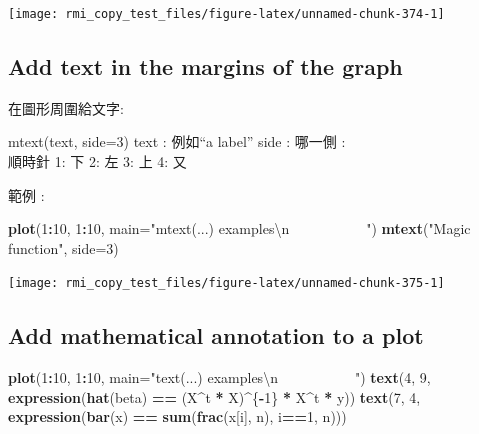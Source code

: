 \documentclass[]{book}
\newenvironment{Shaded}{\begin{snugshade}}{\end{snugshade}}
\newcommand{\KeywordTok}[1]{\textcolor[rgb]{0.13,0.29,0.53}{\textbf{#1}}}
\newcommand{\DataTypeTok}[1]{\textcolor[rgb]{0.13,0.29,0.53}{#1}}
\newcommand{\DecValTok}[1]{\textcolor[rgb]{0.00,0.00,0.81}{#1}}
\newcommand{\CharTok}[1]{\textcolor[rgb]{0.31,0.60,0.02}{#1}}
\newcommand{\StringTok}[1]{\textcolor[rgb]{0.31,0.60,0.02}{#1}}
\newcommand{\OperatorTok}[1]{\textcolor[rgb]{0.81,0.36,0.00}{\textbf{#1}}}
\newcommand{\NormalTok}[1]{#1}
\theoremstyle{definition}
\theoremstyle{definition}
\theoremstyle{definition}
\theoremstyle{remark}
\begin{document}
\begin{center}\texttt{[image: rmi\_copy\_test\_files/figure-latex/unnamed-chunk-374-1]} \end{center}

\subsection{Add text in the margins of the
graph}\label{add-text-in-the-margins-of-the-graph}

在圖形周圍給文字:

mtext(text, side=3) text : 例如``a label'' side : 哪一側 :\\
順時針 1: 下 2: 左 3: 上 4: 又

範例 :

\begin{Shaded}
\begin{Highlighting}[]
\KeywordTok{plot}\NormalTok{(}\DecValTok{1}\OperatorTok{:}\DecValTok{10}\NormalTok{, }\DecValTok{1}\OperatorTok{:}\DecValTok{10}\NormalTok{, }
     \DataTypeTok{main=}\StringTok{"mtext(...) examples}\CharTok{\textbackslash{}n}\StringTok{~~~~~~~~~~~"}\NormalTok{)}
\KeywordTok{mtext}\NormalTok{(}\StringTok{"Magic function"}\NormalTok{, }\DataTypeTok{side=}\DecValTok{3}\NormalTok{)}
\end{Highlighting}
\end{Shaded}

\begin{center}\texttt{[image: rmi\_copy\_test\_files/figure-latex/unnamed-chunk-375-1]} \end{center}

\subsection{Add mathematical annotation to a
plot}\label{add-mathematical-annotation-to-a-plot}

\begin{Shaded}
\begin{Highlighting}[]
\KeywordTok{plot}\NormalTok{(}\DecValTok{1}\OperatorTok{:}\DecValTok{10}\NormalTok{, }\DecValTok{1}\OperatorTok{:}\DecValTok{10}\NormalTok{, }
     \DataTypeTok{main=}\StringTok{"text(...) examples}\CharTok{\textbackslash{}n}\StringTok{~~~~~~~~~~~"}\NormalTok{)}
\KeywordTok{text}\NormalTok{(}\DecValTok{4}\NormalTok{, }\DecValTok{9}\NormalTok{, }\KeywordTok{expression}\NormalTok{(}\KeywordTok{hat}\NormalTok{(beta) }\OperatorTok{==}\StringTok{ }\NormalTok{(X}\OperatorTok{^}\NormalTok{t }\OperatorTok{*}\StringTok{ }\NormalTok{X)}\OperatorTok{^}\NormalTok{\{}\OperatorTok{-}\DecValTok{1}\NormalTok{\} }\OperatorTok{*}\StringTok{ }\NormalTok{X}\OperatorTok{^}\NormalTok{t }\OperatorTok{*}\StringTok{ }\NormalTok{y))}
\KeywordTok{text}\NormalTok{(}\DecValTok{7}\NormalTok{, }\DecValTok{4}\NormalTok{, }\KeywordTok{expression}\NormalTok{(}\KeywordTok{bar}\NormalTok{(x) }\OperatorTok{==}\StringTok{ }\KeywordTok{sum}\NormalTok{(}\KeywordTok{frac}\NormalTok{(x[i], n), i}\OperatorTok{==}\DecValTok{1}\NormalTok{, n)))}
\end{Highlighting}
\end{Shaded}
\end{document}
